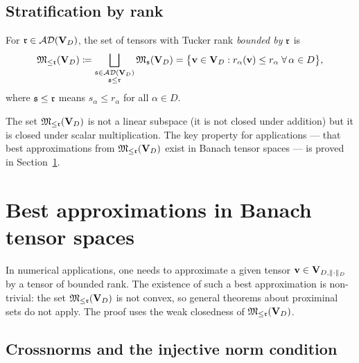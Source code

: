 \subsection*{Stratification by rank}

\begin{definition}
\label{def:bounded_tucker_rank}
For $\mathfrak{r} \in \mathcal{AD}(\mathbf{V}_D)$, the set of tensors with Tucker rank
\emph{bounded by} $\mathfrak{r}$ is
\begin{equation}
\label{eq:tucker_bounded}
    \mathfrak{M}_{\leq\mathfrak{r}}(\mathbf{V}_D)
    \coloneqq
    \bigsqcup_{\substack{\mathfrak{s} \in \mathcal{AD}(\mathbf{V}_D) \\ \mathfrak{s} \leq \mathfrak{r}}}
    \mathfrak{M}_{\mathfrak{s}}(\mathbf{V}_D)
    =
    \bigl\{
        \mathbf{v} \in \mathbf{V}_D : r_\alpha(\mathbf{v}) \leq r_\alpha \;\forall\, \alpha \in D
    \bigr\},
\end{equation}
where $\mathfrak{s} \leq \mathfrak{r}$ means $s_\alpha \leq r_\alpha$ for all $\alpha \in D$.
\end{definition}

The set $\mathfrak{M}_{\leq\mathfrak{r}}(\mathbf{V}_D)$ is not a linear subspace (it is not
closed under addition) but it is closed under scalar multiplication.
The key property for applications — that best approximations from
$\mathfrak{M}_{\leq\mathfrak{r}}(\mathbf{V}_D)$ exist in Banach tensor spaces — is proved in
Section~\ref{sec:min:bestapprox}.

\section{Best approximations in Banach tensor spaces}
\label{sec:min:bestapprox}

In numerical applications, one needs to approximate a given tensor
$\mathbf{v} \in \mathbf{V}_{D,\|\cdot\|_D}$ by a tensor of bounded rank. The existence of such
a best approximation is non-trivial: the set $\mathfrak{M}_{\leq\mathfrak{r}}(\mathbf{V}_D)$
is not convex, so general theorems about proximinal sets do not apply.
The proof uses the weak closedness of $\mathfrak{M}_{\leq\mathfrak{r}}(\mathbf{V}_D)$.

\subsection*{Crossnorms and the injective norm condition}

